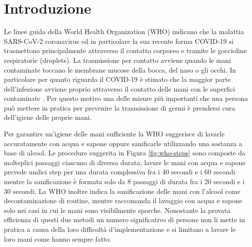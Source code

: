 \chapter{Introduzione}
\label{cap:introduzione}

Le linee guida della World Health Organization (WHO) indicano che la malattia SARS-CoV-2 coronavirus ed in particolare la sua recente forma COVID-19 si trasmettono principalmente 
attraverso il contatto corporeo e tramite le goccioline respiratorie (droplets). La trasmissione per contatto avviene quando le mani contaminate toccano le membrane 
mucose della bocca, del naso o gli occhi. In particolare per quanto riguarda il COVID-19 è stimato che la maggior parte dell'infezione avviene proprio attraverso il contatto 
delle mani con le superfici contaminate \cite{santarpia2020aerosol}. Per questo motivo una delle misure più importanti che una persona può mettere in pratica per prevenire la trasmissione di germi 
è prendersi cura dell'igiene delle proprie mani.

Per garantire un'igiene delle mani sufficiente la WHO suggerisce di lavarle accuratamente con acqua e sapone oppure sanificarle utilizzando una sostanza a base di alcool.
Le procedure suggerita in Figura \ref{fig:who-steps} sono composte da molteplici passaggi ciascuno di diversa durata; lavare le mani con acqua e sapone prevede undici step per una durata complessiva fra 
i 40 secondi e i 60 secondi mentre la sanificazione è formata solo da 8 passaggi di durata fra i 20 secondi e i 30 secondi. 
La WHO inoltre indica la sanificazione delle mani con l'alcool come decontaminazione di routine, mentre raccomanda il lavaggio con acqua e sapone solo nei casi in cui le mani sono visibilmente sporche.
Nonostante la provata efficienza di questi due metodi un numero significativo di persone non li mette in pratica a causa della loro difficoltà d'implementazione e si limitano 
a lavare le loro mani come hanno sempre fatto.

